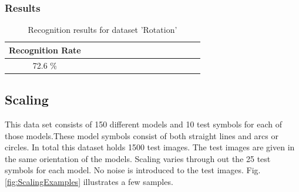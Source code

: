 \subsubsection{Results}
\begin{table}[H]
\centering
\caption{Recognition results for dataset 'Rotation'}
\begin{tabular}{ccccccccccccccc}
  \hline
      Recognition Rate \\
  \hline
      72.6 \% \\
  \hline
\end{tabular}
\end{table}
\vspace{85mm}

\subsection{Scaling}
This data set consists of 150 different models and 10 test symbols for each of those models.These model symbols consist of both straight lines and arcs or circles. In total this dataset holds 1500 test images. The test images are given in the same orientation of the models. Scaling varies through out the 25 test symbols for each model. No noise is introduced to the test images. Fig. \ref{fig:ScalingExamples} illustrates a few samples.


